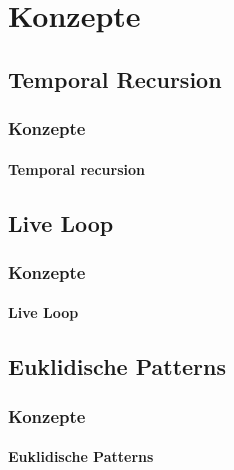 \documentclass{beamer}
\begin{document}
\section{Konzepte}
\subsection{Temporal Recursion}
\begin{frame}
  \frametitle{Konzepte}
  \framesubtitle{Temporal recursion}
\end{frame}

\subsection{Live Loop}
\begin{frame}
  \frametitle{Konzepte}
  \framesubtitle{Live Loop}
\end{frame}


\subsection{Euklidische Patterns}
\begin{frame}
  \frametitle{Konzepte}
  \framesubtitle{Euklidische Patterns}
\end{frame}
\end{document}
